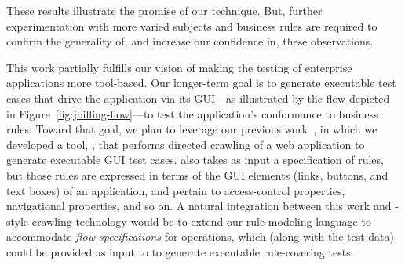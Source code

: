 These results illustrate the promise of our technique. But, further
experimentation with more varied subjects and business rules are
required to confirm the generality of, and increase our confidence in,
these observations.

This work partially fulfills our vision of making the testing of enterprise
applications more tool-based. Our longer-term goal is to generate executable
test cases that drive the application via its GUI---as illustrated by the flow
depicted in Figure~\ref{fig:jbilling-flow}---to test the application's
conformance to business rules. Toward that goal, we plan to leverage our
previous work~\cite{Thummalapenta:2013}, in which we developed a tool, \wateg{},
that performs directed crawling of a web application to generate executable GUI
test cases. \wateg{} also takes as input a specification of rules, but those
rules are expressed in terms of the GUI elements (\eg links, buttons, and text
boxes) of an application, and pertain to access-control properties, navigational
properties, and so on.  A natural integration between this work and
\wateg{}-style crawling technology would be to extend our rule-modeling language
to accommodate \textit{flow specifications} for operations, which (along with
the test data) could be provided as input to \wateg{} to generate executable
rule-covering tests.
